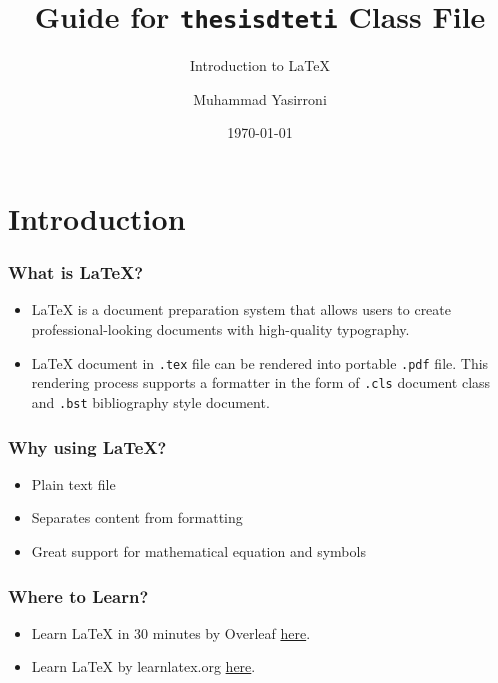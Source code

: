 \documentclass{beamer}
\title{Guide for \texttt{thesisdteti} Class File}
\subtitle{Introduction to LaTeX}
\author{Muhammad Yasirroni}
\institute{Universitas Gadjah Mada}
\date{\today}
\begin{document}
\begin{frame}
  \titlepage
\end{frame}

\section{Introduction}
\begin{frame}
  \frametitle{What is LaTeX?}
  \begin{itemize}
    \item LaTeX is a document preparation system that allows users to create professional-looking documents with high-quality typography.
    \item LaTeX document in \texttt{.tex} file can be rendered into portable \texttt{.pdf} file. This rendering process supports a formatter in the form of \texttt{.cls} document class and \texttt{.bst} bibliography style document.
  \end{itemize}
\end{frame}

\begin{frame}
  \frametitle{Why using LaTeX?}
  \begin{itemize}
    \item Plain text file
    \item Separates content from formatting
    \item Great support for mathematical equation and symbols
  \end{itemize}
\end{frame}

\begin{frame}
  \frametitle{Where to Learn?}
  \begin{itemize}
    \item Learn LaTeX in 30 minutes by Overleaf \href{https://www.overleaf.com/learn/latex/Learn\_LaTeX\_in\_30\_minutes}{here}.
    \item Learn LaTeX by learnlatex.org \href{https://www.learnlatex.org/en/}{here}.
  \end{itemize}
\end{frame}
\end{document}
